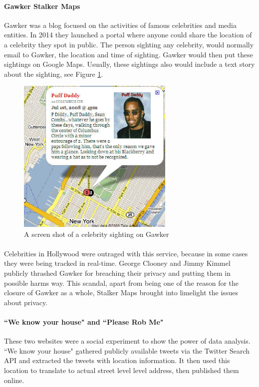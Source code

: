 \documentclass[12pt]{report}
\theoremstyle{named}
\begin{document}
\paragraph{Gawker Stalker Maps\cite{GawkerURL}} Gawker was a blog focused on the activities of famous celebrities and media entities. In 2014 they launched a portal where anyone could share the location of a celebrity they spot in public. The person sighting any celebrity, would normally email to Gawker, the location and time of sighting. Gawker would then put these sightings on Google Maps. Usually, these sightings also would include a text story about the sighting, see Figure \ref{fig:Gawker}. 

\begin{figure}[ht]
\centering
        \includegraphics[width=75mm,scale=0.5]{Images/gawker-stalker.jpg}
    \caption{A screen shot of a celebrity sighting on Gawker}
    \label{fig:Gawker}
\end{figure}
\paragraph{}
Celebrities in Hollywood were outraged with this service, because in some cases they were being tracked in real-time. George Clooney and Jimmy Kimmel publicly thrashed Gawker for breaching their privacy and putting them in possible harms way. This scandal, apart from being one of the reason for the closure of Gawker as a whole, Stalker Maps brought into limelight the issues about privacy.
\paragraph{``We know your house"\cite{WeKnowYourHouse} and ``Please Rob Me"\cite{PleaseRobMe}} These two websites were a social experiment to show the power of data analysis. ``We know your house"\cite{WeKnowYourHouse} gathered publicly available tweets via the Twitter Search API\cite{twiterSearchAPI} and extracted the tweets with location information. It then used this location to translate to actual street level level address, then published them online. 
\end{document}
